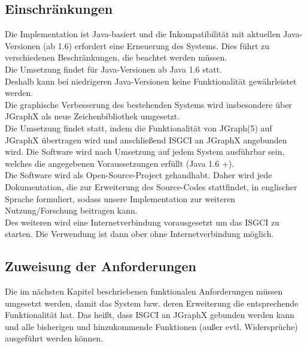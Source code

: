 \documentclass[10pt,a4paper]{article}
\begin{document}
	\subsection{Einschränkungen} %
	Die Implementation ist Java-basiert und die Inkompatibilität mit aktuellen Java-Versionen (ab 1.6) erfordert eine Erneuerung des Systems. Dies führt zu verschiedenen Beschränkungen, die beachtet werden müssen.\\
	Die Umsetzung findet für Java-Versionen ab Java 1.6 statt. \\
	Deshalb kann bei niedrigeren Java-Versionen keine Funktionalität gewährleistet werden.\\
	Die graphische Verbesserung des bestehenden Systems wird insbesondere über JGraphX als neue Zeichenbibliothek umgesetzt.\\
	Die Umsetzung findet statt, indem die Funktionalität von JGraph(5) auf JGraphX übertragen wird und anschließend ISGCI an JGraphX angebunden wird.  %
	Die Software wird nach Umsetzung auf jedem System ausführbar sein, welches die angegebenen Voraussetzungen erfüllt (Java 1.6 +).\\
	Die Software wird als Open-Source-Project %
gehandhabt. Daher wird jede Dokumentation, die zur Erweiterung des Source-Codes stattfindet, in englischer Sprache formuliert, sodass unsere Implementation zur weiteren Nutzung/Forschung beitragen kann. \\
	Des weiteren wird eine Internetverbindung vorausgesetzt um das ISGCI zu starten. Die Verwendung ist dann ober ohne Internetverbindung möglich.
	\subsection{Zuweisung der Anforderungen} %
	Die im nächsten Kapitel beschriebenen funktionalen Anforderungen müssen umgesetzt werden, damit das System bzw. deren Erweiterung die entsprechende Funktionalität hat. Das heißt, dass ISGCI an JGraphX gebunden werden kann und alle bisherigen und hinzukommende Funktionen (außer evtl. Widersprüche) ausgeführt werden können.
\newpage
\end{document}
